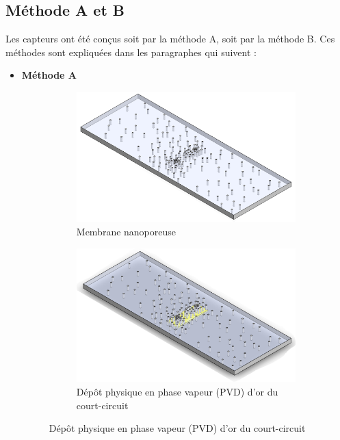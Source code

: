 \newpage
\subsection{Méthode A et B}
Les capteurs ont été conçus soit par la méthode A, soit par la méthode B. Ces méthodes sont expliquées dans les paragraphes qui suivent :
\begin{itemize}
    \item \textbf{Méthode A}
          \begin{figure}[H]
              \centering
              \begin{subfigure}{0.45\textwidth}
                  \includegraphics[scale = 0.22]{assets/figures/Membrane_nue.png}
                  \caption{Membrane nanoporeuse}
              \end{subfigure}
              \begin{subfigure}{0.45\textwidth}
                  \includegraphics[scale = 0.27]{assets/figures/Court_circuit.png}
                  \caption{Dépôt physique en phase vapeur (PVD) d'or du court-circuit}

\end{subfigure}
\end{figure}
\end{itemize}
